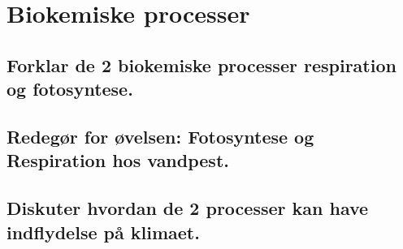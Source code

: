 \newpage
\section{Biokemiske processer}
\subsection{Forklar de 2 biokemiske processer respiration og fotosyntese.}
\subsection{Redegør for øvelsen: Fotosyntese og Respiration hos vandpest.}
\subsection{Diskuter hvordan de 2 processer kan have indflydelse på klimaet.}